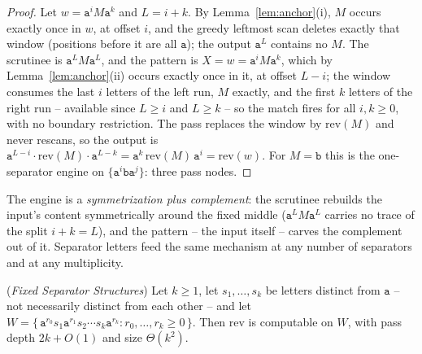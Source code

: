 \documentclass[runningheads,envcountsect]{llncs}
\begin{document}
\begin{proof}
    Let $w = \mathtt a^i M \mathtt a^k$ and $L = i + k$. By Lemma~\ref{lem:anchor}(i), $M$ occurs exactly once in $w$, at offset $i$, and the greedy leftmost scan deletes exactly that window (positions before it are all $\mathtt a$); the output $\mathtt a^{L}$ contains no $M$. The scrutinee is $\mathtt a^{L} M \mathtt a^{L}$, and the pattern is $X = w = \mathtt a^i M \mathtt a^k$, which by Lemma~\ref{lem:anchor}(ii) occurs exactly once in it, at offset $L - i$; the window consumes the last $i$ letters of the left run, $M$ exactly, and the first $k$ letters of the right run -- available since $L \geq i$ and $L \geq k$ -- so the match fires for all $i, k \geq 0$, with no boundary restriction. The pass replaces the window by $\mathrm{rev}(M)$ and never rescans, so the output is
    $\mathtt a^{L-i} \cdot \mathrm{rev}(M) \cdot \mathtt a^{L-k} = \mathtt a^{k}\,\mathrm{rev}(M)\,\mathtt a^{i} = \mathrm{rev}(w)$.
    For $M = \mathtt b$ this is the one-separator engine on $\{\mathtt a^i \mathtt b \mathtt a^j\}$: three pass nodes.
\end{proof}

The engine is a \emph{symmetrization plus complement}: the scrutinee rebuilds the input's content symmetrically around the fixed middle ($\mathtt a^L M \mathtt a^L$ carries no trace of the split $i + k = L$), and the pattern -- the input itself -- carves the complement out of it. Separator letters feed the same mechanism at any number of separators and at any multiplicity.

\begin{theorem}
    (\emph{Fixed Separator Structures})
    \label{thm:separators}
    Let $k \geq 1$, let $s_1, \dots, s_k$ be letters distinct from $\mathtt a$ -- not necessarily distinct from each other -- and let $W = \{\, \mathtt a^{r_0} s_1 \mathtt a^{r_1} s_2 \cdots s_k \mathtt a^{r_k} : r_0, \dots, r_k \geq 0 \,\}$. Then $\mathrm{rev}$ is computable on $W$, with pass depth $2k + O(1)$ and size $\Theta(k^2)$.
\end{theorem}
\end{document}
